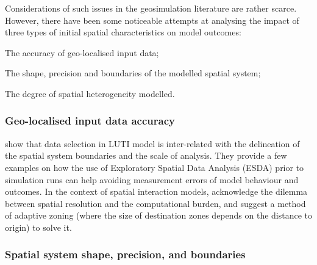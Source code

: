 \documentclass{JASSS}
\begin{document}
Considerations of such issues in the geosimulation literature are rather scarce. However, there have been some noticeable attempts at analysing the impact of three types of initial spatial characteristics on model outcomes:
\begin{itemize*}
\item The accuracy of geo-localised input data;
\item The shape, precision and boundaries of the modelled spatial system;
\item The degree of spatial heterogeneity modelled.
\end{itemize*}

\subsubsection{Geo-localised input data accuracy}

\citet{Thomasetal2017} show that data selection in LUTI model is inter-related with the delineation of the spatial system boundaries and the scale of analysis. They provide a few examples on how the use of Exploratory Spatial Data Analysis (ESDA) prior to simulation runs can help avoiding measurement errors of model behaviour and outcomes. In the context of spatial interaction models, \citet{hagen2012new} acknowledge the dilemma between spatial resolution and the computational burden, and suggest a method of adaptive zoning (where the size of destination zones depends on the distance to origin) to solve it.

\subsubsection{Spatial system shape, precision, and boundaries} 
\end{document}
